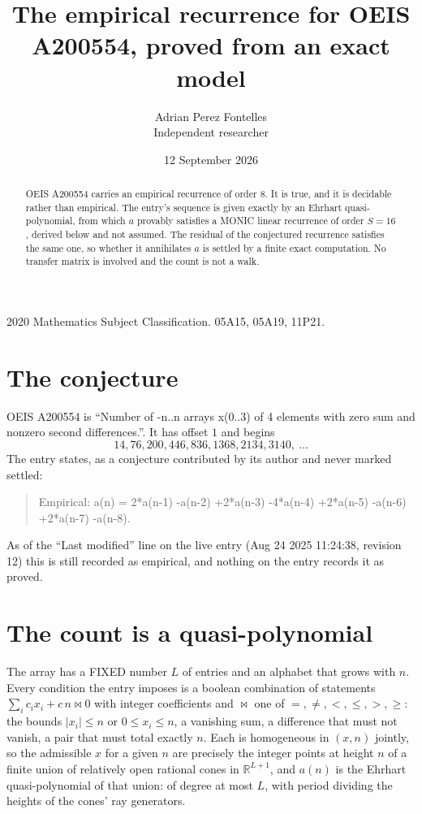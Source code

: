 \documentclass[11pt,a4paper]{article}
\title{The empirical recurrence for OEIS A200554, proved from an exact model}
\author{Adrian Perez Fontelles\\ \small Independent researcher}
\date{12 September 2026}
\theoremstyle{plain}
\theoremstyle{definition}
\begin{document}
\maketitle

\begin{abstract}
OEIS A200554 carries an empirical recurrence of order $8$. It is true, and it is
decidable rather than empirical. The entry's sequence is given exactly by an Ehrhart quasi-polynomial, from
which $a$ provably satisfies a MONIC linear recurrence of order $S=16$, derived below and not
assumed. The residual of the conjectured recurrence satisfies the same one, so whether it
annihilates $a$ is settled by a finite exact computation. No transfer matrix is involved and
the count is not a walk.
\end{abstract}

\noindent\small 2020 Mathematics Subject Classification. 05A15, 05A19, 11P21.\normalsize

\section{The conjecture}

OEIS A200554 is ``Number of -n..n arrays x(0..3) of 4 elements with zero sum and nonzero second differences.''. It has offset $1$ and begins
\[
14, 76, 200, 446, 836, 1368, 2134, 3140,\ \dots
\]
The entry states, as a conjecture contributed by its author and never marked settled:
\begin{quote}
Empirical: a(n) = 2*a(n-1) -a(n-2) +2*a(n-3) -4*a(n-4) +2*a(n-5) -a(n-6) +2*a(n-7) -a(n-8).
\end{quote}
As of the ``Last modified'' line on the live entry (Aug 24 2025 11:24:38, revision 12)
this is still recorded as empirical, and nothing on the entry records it as proved.

\section{The count is a quasi-polynomial}

The array has a FIXED number $L$ of entries and an alphabet that grows with $n$. Every
condition the entry imposes is a boolean combination of statements
$\sum_i c_ix_i + c\,n \bowtie 0$ with integer coefficients and $\bowtie$ one of
$=,\ne,<,\le,>,\ge$: the bounds $|x_i|\le n$ or $0\le x_i\le n$, a vanishing sum, a difference
that must not vanish, a pair that must total exactly $n$. Each is homogeneous in $(x,n)$
jointly, so the admissible $x$ for a given $n$ are precisely the integer points at height $n$
of a finite union of relatively open rational cones in $\mathbb{R}^{L+1}$, and $a(n)$ is
the Ehrhart quasi-polynomial of that union: of degree at most $L$, with period dividing the
heights of the cones' ray generators.
\end{document}
